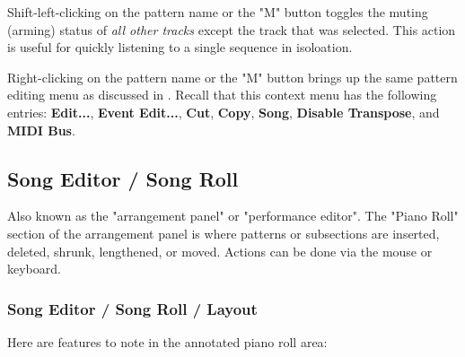    Shift-left-clicking on the pattern name or the "M" button toggles the muting
   (arming) status of \textsl{all other tracks} except the track that was
   selected.  This action is useful for quickly listening to a single sequence
   in isoloation.

   Right-clicking on the pattern name or the "M" button brings up the same
   pattern editing menu as discussed in
   .
   Recall that this context menu has the following entries:
   \textbf{Edit...}, \textbf{Event Edit...}, \textbf{Cut}, \textbf{Copy},
   \textbf{Song}, \textbf{Disable Transpose}, and \textbf{MIDI Bus}.

\subsection{Song Editor / Song Roll}
\label{subsec:song_editor_song_roll}

   Also known as the "arrangement panel" or "performance editor".
   The "Piano Roll" section of the arrangement panel is where patterns or
   subsections are inserted, deleted, shrunk, lengthened, or moved.
   Actions can be done via the mouse or keyboard.

\subsubsection{Song Editor / Song Roll / Layout}
\label{subsubsec:song_editor_song_roll_layout}

   Here are features to note in the annotated piano roll area:

